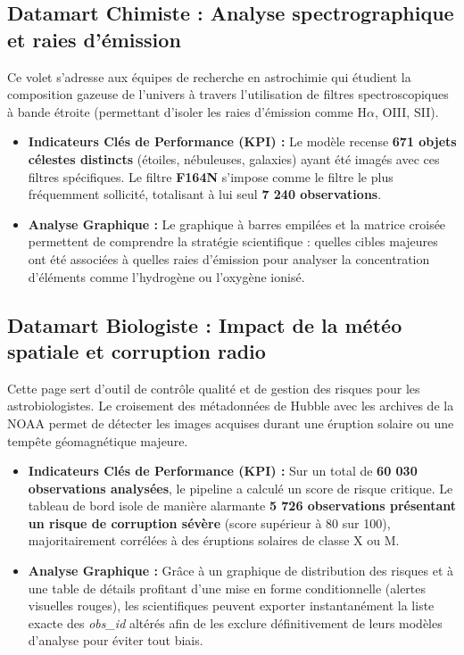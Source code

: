 \documentclass[11pt,a4paper]{article}
\begin{document}
\subsection{Datamart Chimiste : Analyse spectrographique et raies d'émission}
Ce volet s'adresse aux équipes de recherche en astrochimie qui étudient la composition gazeuse de l'univers à travers l'utilisation de filtres spectroscopiques à bande étroite (permettant d'isoler les raies d'émission comme H$\alpha$, OIII, SII).

\begin{itemize}
    \item \textbf{Indicateurs Clés de Performance (KPI) :} Le modèle recense \textbf{671 objets célestes distincts} (étoiles, nébuleuses, galaxies) ayant été imagés avec ces filtres spécifiques. Le filtre \textbf{F164N} s'impose comme le filtre le plus fréquemment sollicité, totalisant à lui seul \textbf{7 240 observations}.
    \item \textbf{Analyse Graphique :} Le graphique à barres empilées et la matrice croisée permettent de comprendre la stratégie scientifique : quelles cibles majeures ont été associées à quelles raies d'émission pour analyser la concentration d'éléments comme l'hydrogène ou l'oxygène ionisé.
\end{itemize}

\subsection{Datamart Biologiste : Impact de la météo spatiale et corruption radio}
Cette page sert d'outil de contrôle qualité et de gestion des risques pour les astrobiologistes. Le croisement des métadonnées de Hubble avec les archives de la NOAA permet de détecter les images acquises durant une éruption solaire ou une tempête géomagnétique majeure.

\begin{itemize}
    \item \textbf{Indicateurs Clés de Performance (KPI) :} Sur un total de \textbf{60 030 observations analysées}, le pipeline a calculé un score de risque critique. Le tableau de bord isole de manière alarmante \textbf{5 726 observations présentant un risque de corruption sévère} (score supérieur à 80 sur 100), majoritairement corrélées à des éruptions solaires de classe X ou M.
    \item \textbf{Analyse Graphique :} Grâce à un graphique de distribution des risques et à une table de détails profitant d'une mise en forme conditionnelle (alertes visuelles rouges), les scientifiques peuvent exporter instantanément la liste exacte des \textit{obs\_id} altérés afin de les exclure définitivement de leurs modèles d'analyse pour éviter tout biais.
\end{itemize}
\end{document}
